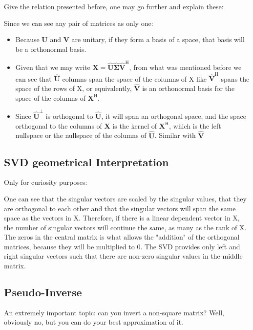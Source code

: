 \documentclass[12pt, a4paper]{article}
\begin{document}
\par Give the relation presented before, one may go further and explain these:


\par Since we can see any pair of matrices as only one:
\begin{itemize}
    \item Because $\mathbf{U}$ and $\mathbf{V}$ are unitary, if they form a basis of a space, that basis will be a orthonormal basis.
    \item Given that we may write $\mathbf{X} = \mathbf{\hat{U} \hat{\Sigma} \hat{V}}^\text{H}$, from what was mentioned before we can see that $\mathbf{\hat{U}}$ columns span the space of the columns of X like $\mathbf{\hat{V}}^\text{H}$ spans the space of the rows of X, or equivalently, $\mathbf{\hat{V}}$ is an orthonormal basis for the space of the columns of $\mathbf{X}^\text{H}$.
    \item Since $\mathbf{\hat{U}}^\perp$ is orthogonal to $\mathbf{\hat{U}}$, it will span an orthogonal space, and the space orthogonal to the columns of $\mathbf{X}$ is the kernel of $\mathbf{X}^\text{H}$, which is the left nullspace or the nullspace of the columns of $\mathbf{\hat{U}}$. Similar with $\mathbf{\hat{V}}$
\end{itemize}


\subsection{SVD geometrical Interpretation}
\par Only for curiosity purposes:


\par One can see that the singular vectors are scaled by the singular values, that they are orthogonal to each other and that the singular vectors will span the same space as the vectors in X. Therefore, if there is a linear dependent vector in  X, the number of singular vectors will continue the same, as many as the rank of X. The zeros in the central matrix is what allows the "addition" of the orthogonal matrices, because they will be multiplied to 0. The  SVD provides only left and right singular vectors such that there are non-zero singular values in the middle matrix.




\subsection{Pseudo-Inverse} \label{sec:important_math_pseudoinverse}
An extremely important topic: can you invert a non-square matrix?
Well, obviously no, but you can do your best approximation of it.
\end{document}
